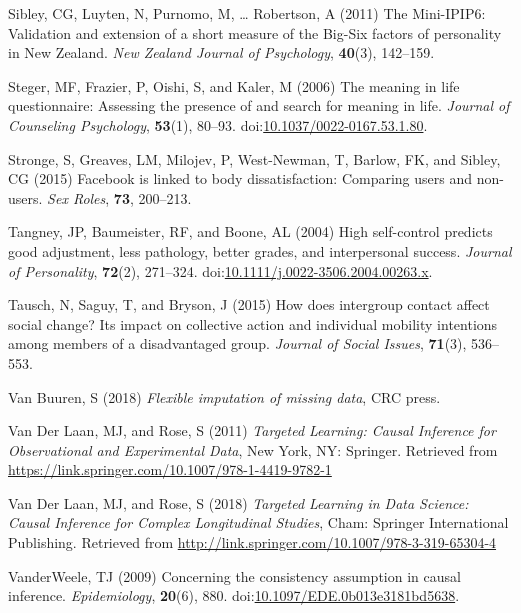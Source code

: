 \documentclass[
  single column]{article}
\newlength{\cslhangindent}
\newenvironment{CSLReferences}[2] %
 {\begin{list}{}{%
  \setlength{\itemindent}{0pt}
  \setlength{\leftmargin}{0pt}
  \setlength{\parsep}{0pt}
  \ifodd #1
   \setlength{\leftmargin}{\cslhangindent}
   \setlength{\itemindent}{-1\cslhangindent}
  \fi
  \setlength{\itemsep}{#2\baselineskip}}}
 {\end{list}}
\begin{document}
\begin{CSLReferences}{1}{0}
Sibley, CG, Luyten, N, Purnomo, M, \ldots{} Robertson, A (2011) The
Mini-IPIP6: Validation and extension of a short measure of the Big-Six
factors of personality in New Zealand. \emph{New Zealand Journal of
Psychology}, \textbf{40}(3), 142--159.

Steger, MF, Frazier, P, Oishi, S, and Kaler, M (2006) The meaning in
life questionnaire: Assessing the presence of and search for meaning in
life. \emph{Journal of Counseling Psychology}, \textbf{53}(1), 80--93.
doi:\href{https://doi.org/10.1037/0022-0167.53.1.80}{10.1037/0022-0167.53.1.80}.

Stronge, S, Greaves, LM, Milojev, P, West-Newman, T, Barlow, FK, and
Sibley, CG (2015) Facebook is linked to body dissatisfaction: Comparing
users and non-users. \emph{Sex Roles}, \textbf{73}, 200--213.

Tangney, JP, Baumeister, RF, and Boone, AL (2004) High self-control
predicts good adjustment, less pathology, better grades, and
interpersonal success. \emph{Journal of Personality}, \textbf{72}(2),
271--324.
doi:\href{https://doi.org/10.1111/j.0022-3506.2004.00263.x}{10.1111/j.0022-3506.2004.00263.x}.

Tausch, N, Saguy, T, and Bryson, J (2015) How does intergroup contact
affect social change? Its impact on collective action and individual
mobility intentions among members of a disadvantaged group.
\emph{Journal of Social Issues}, \textbf{71}(3), 536--553.

Van Buuren, S (2018) \emph{Flexible imputation of missing data}, CRC
press.

Van Der Laan, MJ, and Rose, S (2011) \emph{Targeted Learning: Causal
Inference for Observational and Experimental Data}, New York, NY:
Springer. Retrieved from
\url{https://link.springer.com/10.1007/978-1-4419-9782-1}

Van Der Laan, MJ, and Rose, S (2018) \emph{Targeted Learning in Data
Science: Causal Inference for Complex Longitudinal Studies}, Cham:
Springer International Publishing. Retrieved from
\url{http://link.springer.com/10.1007/978-3-319-65304-4}

VanderWeele, TJ (2009) Concerning the consistency assumption in causal
inference. \emph{Epidemiology}, \textbf{20}(6), 880.
doi:\href{https://doi.org/10.1097/EDE.0b013e3181bd5638}{10.1097/EDE.0b013e3181bd5638}.


\end{CSLReferences}
\end{document}

